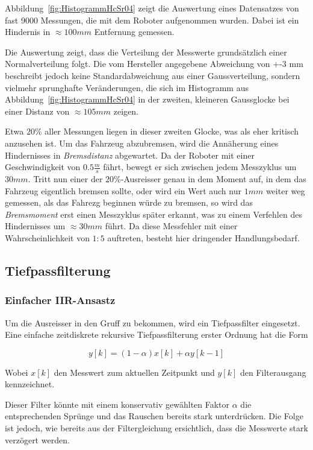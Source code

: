 \documentclass[main.tex]{subfiles} %
\begin{document}
Abbildung~\ref{fig:HistogrammHcSr04} zeigt die Auswertung eines Datensatzes von
fast 9000 Messungen, die mit dem Roboter aufgenommen wurden. Dabei ist ein
Hindernis in $\approx 100mm$ Entfernung gemessen.

Die Auswertung zeigt, dass die Verteilung der Messwerte grundsätzlich einer
Normalverteilung folgt. Die vom Hersteller angegebene Abweichung von +-3 mm
beschreibt jedoch keine Standardabweichung aus einer Gaussverteilung, sondern
vielmehr sprunghafte Veränderungen, die sich im Histogramm aus
Abbildung~\ref{fig:HistogrammHcSr04} in der zweiten, kleineren Gaussglocke bei
einer Distanz von $\approx 105mm$ zeigen.

Etwa $20 \%$ aller Messungen liegen in dieser zweiten Glocke, was als eher
kritisch anzusehen ist. Um das Fahrzeug abzubremsen, wird die Annäherung eines
Hindernisses in \textit{Bremsdistanz} abgewartet. Da der Roboter mit einer
Geschwindigkeit von $0.5 \frac{m}{s}$ fährt, bewegt er sich zwischen jedem
Messzyklus um $30 mm$. Tritt nun einer der $20\%$-Ausreisser genau in dem
Moment auf, in dem das Fahrzeug eigentlich bremsen sollte, oder wird ein Wert
auch nur $1mm$ weiter weg gemessen, als das Fahrezg beginnen würde zu bremsen,
so wird das \textit{Bremsmoment} erst einen Messzyklus später erkannt, was zu
einem Verfehlen des Hindernisses um $\approx 30 mm$ führt. Da diese Messfehler
mit einer Wahrscheinlichkeit von $1:5$ auftreten, besteht hier dringender
Handlungsbedarf.

\subsection*{Tiefpassfilterung}

\subsubsection*{Einfacher IIR-Ansastz}

Um die Ausreisser in den Gruff zu bekommen, wird ein Tiefpassfilter eingesetzt.
Eine einfache zeitdiskrete rekursive Tiefpassfilterung erster Ordnung hat die
Form

\[
    y[k] = (1 - \alpha) x[k] + \alpha y[k - 1]
\]

Wobei $x[k]$ den Messwert zum aktuellen Zeitpunkt und $y[k]$ den Filterausgang
kennzeichnet.

Dieser Filter könnte mit einem konservativ gewählten Faktor $\alpha$ die
entsprechenden Sprünge und das Rauschen bereits stark unterdrücken. Die Folge
ist jedoch, wie bereits aus der Filtergleichung ersichtlich, dass die Messwerte
stark verzögert werden.
\end{document}
